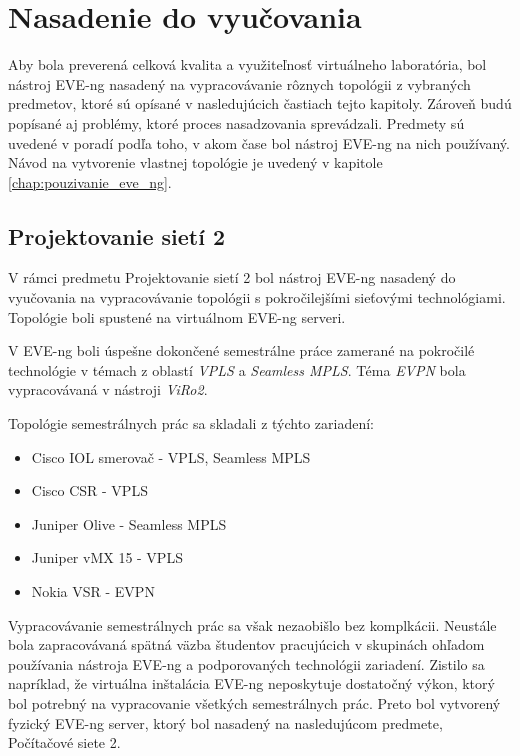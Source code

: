\chapter{Nasadenie do vyučovania}
\label{chap:nasadenie_do_vyucovania}

Aby bola preverená celková kvalita a využiteľnosť virtuálneho laboratória, bol nástroj EVE-ng nasadený na vypracovávanie rôznych topológii z vybraných predmetov, ktoré sú opísané v nasledujúcich častiach tejto kapitoly. Zároveň budú popísané aj problémy, ktoré proces nasadzovania sprevádzali. Predmety sú uvedené v poradí podľa toho, v akom čase bol nástroj EVE-ng na nich používaný. Návod na vytvorenie vlastnej topológie je uvedený v kapitole \ref{chap:pouzivanie_eve_ng}.





\section{Projektovanie sietí 2}

V rámci predmetu Projektovanie sietí 2 bol nástroj EVE-ng nasadený do vyučovania na vypracovávanie topológii s pokročilejšími sieťovými technológiami. Topológie boli spustené na virtuálnom EVE-ng serveri.

V EVE-ng boli úspešne dokončené semestrálne práce zamerané na pokročilé technológie v témach z oblastí \emph{VPLS} a \emph{Seamless MPLS}. Téma \emph{EVPN} bola vypracovávaná v nástroji \emph{ViRo2}.

Topológie semestrálnych prác sa skladali z týchto zariadení:

\begin{itemize}[noitemsep]
    \item Cisco IOL smerovač - VPLS, Seamless MPLS
    \item Cisco CSR - VPLS
    \item Juniper Olive - Seamless MPLS
    \item Juniper vMX 15 - VPLS
    \item Nokia VSR - EVPN
\end{itemize}

Vypracovávanie semestrálnych prác sa však nezaobišlo bez komplkácii. Neustále bola zapracovávaná spätná väzba študentov pracujúcich v skupinách ohľadom používania nástroja EVE-ng a podporovaných technológii zariadení. Zistilo sa napríklad, že virtuálna inštalácia EVE-ng neposkytuje dostatočný výkon, ktorý bol potrebný na vypracovanie všetkých semestrálnych prác. Preto bol vytvorený fyzický EVE-ng server, ktorý bol nasadený na nasledujúcom predmete, Počítačové siete 2.





